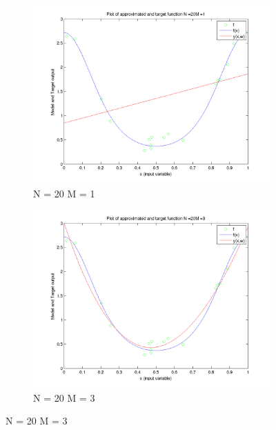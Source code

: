 \documentclass{article}
\begin{document}
\begin{figure}[H]

\begin{subfigure}{.5\textwidth}
\centering
\includegraphics[width=\linewidth]{VaryingM_N20M1}
\caption{N = 20 M = 1}
\end{subfigure}
\begin{subfigure}{.5\textwidth}
\includegraphics[width=\linewidth]{VaryingM_N20M3}
\caption{N = 20 M = 3}
\end{subfigure}



\end{figure}
\end{document}
